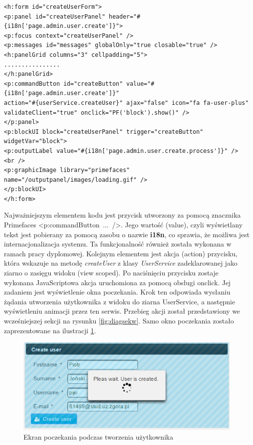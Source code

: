 \begin{lstlisting}[caption={Kod formularza tworzenia użytkownika}, label=lis:kod_form_tworzenia_uzyt, numbers=none]
<h:form id="createUserForm">
<p:panel id="createUserPanel" header="#{i18n['page.admin.user.create']}">
<p:focus context="createUserPanel" />
<p:messages id="messages" globalOnly="true closable="true" />
<h:panelGrid columns="3" cellpadding="5">
................
</h:panelGrid>
<p:commandButton id="createButton" value="#{i18n['page.admin.user.create']}"
action="#{userService.createUser}" ajax="false" icon="fa fa-user-plus"
validateClient="true" onclick="PF('block').show()" />
</p:panel>
<p:blockUI block="createUserPanel" trigger="createButton" widgetVar="block">
<p:outputLabel value="#{i18n['page.admin.user.create.process']}" />
<br />
<p:graphicImage library="primefaces" name="/outputpanel/images/loading.gif" />
</p:blockUI>
</h:form>\end{lstlisting}

Najważniejszym elementem kodu jest przycisk utworzony za pomocą znacznika Primefaces <p:commandButton~...~/>. Jego wartość (value), czyli wyświetlany tekst jest pobierany za pomocą zasobu o nazwie \textbf{i18n}, co sprawia, że możliwa jest internacjonalizacja systemu. Ta funkcjonalność również została wykonana w ramach pracy dyplomowej. Kolejnym elementem jest akcja (action) przycisku, która wskazuje na metodę \textit{createUser} z klasy \textit{UserService} zadeklarowanej jako ziarno o zasięgu widoku (view scoped). Po naciśnięciu przycisku zostaje wykonana JavaScriptowa akcja uruchomiona za pomocą obsługi onclick. Jej zadaniem jest wyświetlenie okna poczekania. Krok ten odpowiada wysłaniu żądania utworzenia użytkownika z widoku do ziarna UserService, a następnie wyświetleniu animacji przez ten serwis. Przebieg akcji został przedstawiony we wcześniejszej sekcji na rysunku \ref{fig:diagsekw}. Samo okno poczekania zostało zaprezentowane na ilustracji \ref{fig:user-czekanie}. 
\begin{figure}[h!]
	\centering
	\includegraphics[width=15cm]{rysunki/user-czekanie.png}	
	\caption{Ekran poczekania podczas tworzenia użytkownika}
	\label{fig:user-czekanie}
\end{figure}

